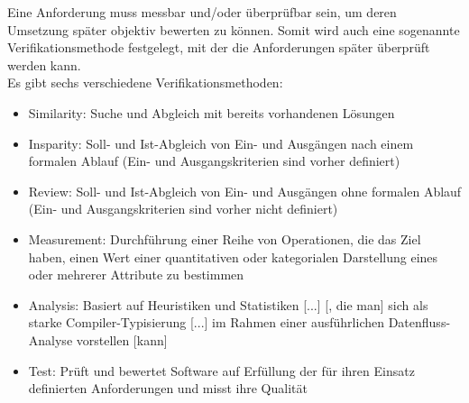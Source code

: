 Eine Anforderung muss messbar und/oder überprüfbar sein, um deren Umsetzung später objektiv bewerten zu können. Somit wird auch eine sogenannte Verifikationsmethode festgelegt, mit der die Anforderungen später überprüft werden kann. \\
Es gibt sechs verschiedene Verifikationsmethoden:
\begin{itemize}
	\item Similarity: Suche und Abgleich mit bereits vorhandenen Lösungen \cite[S. 122]{HelgaMeyer.}
	\item Insparity: Soll- und Ist-Abgleich von Ein- und Ausgängen nach einem formalen Ablauf (Ein- und Ausgangskriterien sind vorher definiert) \cite[vgl. S. 308]{PeterLiggesmeyer.2009}
	\item Review: Soll- und Ist-Abgleich von Ein- und Ausgängen ohne formalen Ablauf (Ein- und Ausgangskriterien sind vorher nicht definiert) \cite[vgl. S. 317]{PeterLiggesmeyer.2009}
	\item Measurement: Durchführung einer Reihe von Operationen, die das Ziel haben, einen Wert einer quantitativen oder kategorialen Darstellung eines oder mehrerer Attribute zu bestimmen \cite[vgl. S. 395]{DepartmentofResearch&DevelopmentDepartmentofInformationTechnologiesandSystems.}
	\item Analysis: Basiert auf Heuristiken und Statistiken [...] [, die man] sich als starke Compiler-Typisierung [...] im Rahmen einer ausführlichen Datenfluss-Analyse vorstellen [kann] \cite[vgl. S. 4]{JayAbrahamPaulJonesRaoulJetley.}
	\item Test: Prüft und bewertet Software auf Erfüllung der für ihren Einsatz definierten Anforderungen und misst ihre Qualität \cite{Wikipedia.01.03.2020}
\end{itemize}

